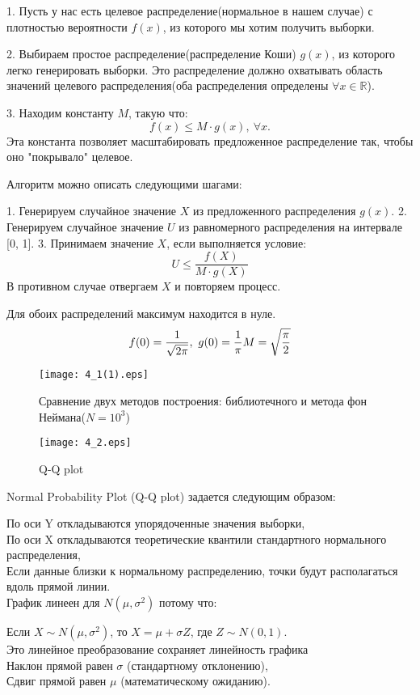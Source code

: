 \documentclass[11pt]{article}
\begin{document}
1. Пусть у нас есть целевое распределение(нормальное в нашем случае) с плотностью вероятности $ f(x) $, из которого мы хотим получить выборки.

2. Выбираем простое распределение(распределение Коши) $g(x)$, из которого легко генерировать выборки. Это распределение должно охватывать область значений целевого распределения(оба распределения определены $\forall x \in \mathbb{R}$).

3. Находим константу $ M $, такую что:
   $$
   f(x) \leq M \cdot g(x),~ \forall x.
   $$
   Эта константа позволяет масштабировать предложенное распределение так, чтобы оно "покрывало" целевое.


Алгоритм можно описать следующими шагами:

   1. Генерируем случайное значение $ X $ из предложенного распределения $ g(x) $.
   2. Генерируем случайное значение $ U $ из равномерного распределения на интервале [0, 1].
   3. Принимаем значение $ X $, если выполняется условие:
   $$
   U \leq \frac{f(X)}{M \cdot g(X)}
   $$
   В противном случае отвергаем $ X $ и повторяем процесс.

Для обоих распределений максимум находится в нуле. 
$$
   f(0) = \frac{1}{\sqrt{2 \pi} },~ g(0) = \frac{1}{\pi} \\
   M = \sqrt{ \frac{\pi}{2}}
$$


\begin{figure}[ht]
    \texttt{[image: 4\_1(1).eps]} 
    \caption{Сравнение двух методов построения: библиотечного и метода фон Неймана($N=10^3$)}
\end{figure} 
\FloatBarrier


\begin{figure}[ht]
    \texttt{[image: 4\_2.eps]} 
    \caption{Q-Q plot}
\end{figure} 

Normal Probability Plot (Q-Q plot) задается следующим образом:

    По оси Y откладываются упорядоченные значения выборки, \\
    По оси X откладываются теоретические квантили стандартного нормального распределения, \\
    Если данные близки к нормальному распределению, точки будут располагаться вдоль прямой линии. \\

График линеен для $N(\mu, \sigma^2)$ потому что: 

Если $X \sim N(\mu, \sigma^2)$, то $X = \mu + \sigma Z$, где $Z \sim N(0,1)$. \\
Это линейное преобразование сохраняет линейность графика \\
    Наклон прямой равен $\sigma$ (стандартному отклонению), \\
    Сдвиг прямой равен $\mu$ (математическому ожиданию).
\end{document}
